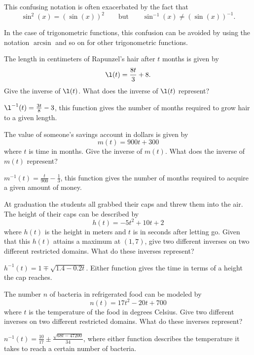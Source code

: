 This confusing notation is often exacerbated by the fact that 
\[
\sin^2(x) = (\sin(x))^2\qquad \text{but} \qquad \sin^{-1}(x)
\ne(\sin(x))^{-1}.
\]

In the case of trigonometric functions, this confusion can be avoided
by using the notation $\arcsin$ and so on for other trigonometric
functions.




\begin{exercises}

\begin{exercise}
The length in centimeters of Rapunzel's hair after $t$ months is given
by
\[
\l(t) = \frac{8t}{3}+8.
\]
Give the inverse of $\l(t)$.  What does the inverse of $\l(t)$
 represent?
\begin{answer}
$\l^{-1}(t) = \frac{3t}{8} - 3$, this function gives the number of
  months required to grow hair to a given length.
\end{answer}
\end{exercise}

\begin{exercise}
The value of someone's savings account in dollars is given by
\[
m(t) = 900t + 300
\]
where $t$ is time in months. Give the inverse of $m(t)$.  What does 
the inverse of $m(t)$ represent?
\begin{answer}
$m^{-1}(t) = \frac{t}{900} - \frac{1}{3}$, this function gives the
  number of months required to acquire a given amount of money.
\end{answer}
\end{exercise}

\begin{exercise}
At graduation the students all grabbed their caps and threw them into
the air.  The height of their caps can be described by 
\[
h(t) = -5t^2+10t+2
\]
where $h(t)$ is the height in meters and $t$ is in seconds after
letting go. Given that this $h(t)$ attains a maximum at $(1,7)$, give two
different inverses on two different restricted domains. What do these
inverses represent?
\begin{answer}
$h^{-1}(t) = 1 \mp \sqrt{1.4-0.2t}$.  Either function gives the time
  in terms of a height the cap reaches.
\end{answer}
\end{exercise}

\begin{exercise}
The number $n$ of bacteria in refrigerated food can be modeled by
\[
n(t) =17t^2 - 20t + 700
\]
where $t$ is the temperature of the food in degrees Celsius.  Give two
different inverses on two different restricted domains. What do these
inverses represent?
\begin{answer}
$n^{-1}(t)= \frac{10}{17} \pm \frac{\sqrt{68t-47200}}{34}$, where
  either function describes the temperature it takes to reach a
  certain number of bacteria.
\end{answer}
\end{exercise}



\end{exercises}
